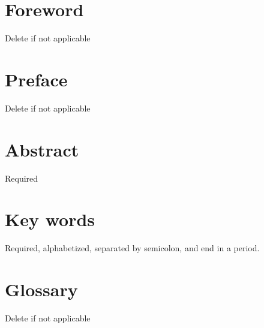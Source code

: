 \documentclass[12pt]{article}
\begin{document}
\section*{Foreword}
\normalsize Delete if not applicable\\
\section*{Preface}
\normalsize Delete if not applicable\\
\section*{Abstract}
\normalsize Required\\
\section*{Key words}
\normalsize Required, alphabetized, separated by semicolon, and end in a period.\\
\pagebreak
\begin{center}
\tableofcontents
\listoftables
\listoffigures
\end{center}
\pagebreak
\section*{Glossary}
Delete if not applicable\\
\pagebreak

\newpage

\newpage

\newpage

\newpage

\newpage

\newpage

\newpage

\newpage

\newpage

\newpage

\newpage

\end{document}
